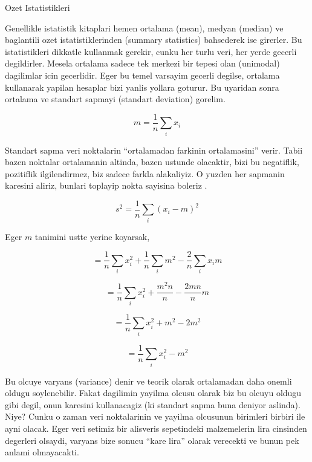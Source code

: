 \documentclass[12pt,fleqn]{article}\usepackage{../common}
\begin{document}
Ozet Istatistikleri 

Genellikle istatistik kitaplari hemen ortalama (mean), medyan (median) ve
baglantili ozet istatistiklerinden (summary statistics) bahsederek ise
girerler. Bu istatistikleri dikkatle kullanmak gerekir, cunku her turlu
veri, her yerde gecerli degildirler. Mesela ortalama sadece tek merkezi bir
tepesi olan (unimodal) dagilimlar icin gecerlidir. Eger bu temel varsayim
gecerli degilse, ortalama kullanarak yapilan hesaplar bizi yanlis yollara
goturur. Bu uyaridan sonra ortalama ve standart sapmayi (standart
deviation) gorelim. 

\[ m  = \frac{ 1}{n}\sum_i x_i \]

Standart sapma veri noktalarin ``ortalamadan farkinin ortalamasini''
verir. Tabii bazen noktalar ortalamanin altinda, bazen ustunde olacaktir,
bizi bu negatiflik, pozitiflik ilgilendirmez, biz sadece farkla
alakaliyiz. O yuzden her sapmanin karesini aliriz, bunlari toplayip nokta
sayisina boleriz .

\[ s^2 = \frac{ 1}{n} \sum_i (x_i - m)^2 \]

Eger $m$ tanimini ustte yerine koyarsak, 

\[ = \frac{ 1}{n} \sum_i x_i^2 + \frac{ 1}{n} \sum_i m^2 - \frac{ 2}{n} \sum_i x_im  \]

\[ = \frac{ 1}{n} \sum_i x_i^2 + \frac{ m^2n}{n} - \frac{ 2mn}{n}m \]

\[ = \frac{ 1}{n} \sum_i x_i^2 +  m^2 - 2m^2 \]

\[ = \frac{ 1}{n} \sum_i x_i^2 - m^2 \]

Bu olcuye varyans (variance) denir ve teorik olarak ortalamadan daha onemli
oldugu soylenebilir. Fakat dagilimin yayilma olcusu olarak biz bu olcuyu
oldugu gibi degil, onun karesini kullanacagiz (ki standart sapma buna
deniyor aslinda). Niye? Cunku o zaman veri noktalarinin ve yayilma olcusunun
birimleri birbiri ile ayni olacak. Eger veri setimiz bir alisveris
sepetindeki malzemelerin lira cinsinden degerleri olsaydi, varyans bize
sonucu ``kare lira'' olarak verecekti ve bunun pek anlami olmayacakti. 
\end{document}
